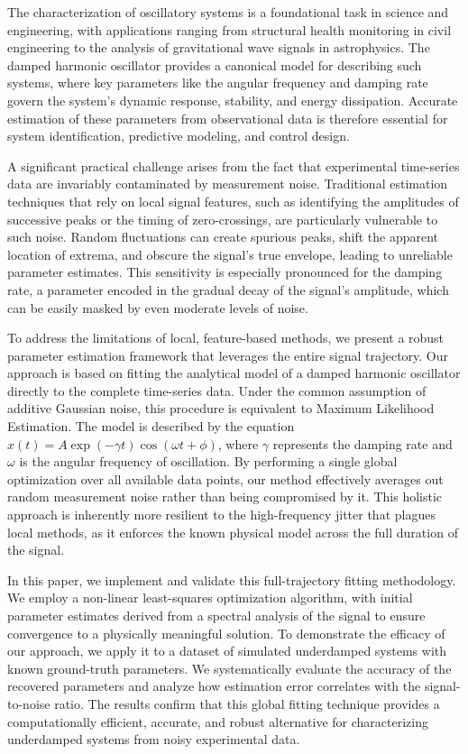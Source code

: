 \documentclass[]{article}
\begin{document}
The characterization of oscillatory systems is a foundational task in science and engineering, with applications ranging from structural health monitoring in civil engineering to the analysis of gravitational wave signals in astrophysics. The damped harmonic oscillator provides a canonical model for describing such systems, where key parameters like the angular frequency and damping rate govern the system's dynamic response, stability, and energy dissipation. Accurate estimation of these parameters from observational data is therefore essential for system identification, predictive modeling, and control design.

A significant practical challenge arises from the fact that experimental time-series data are invariably contaminated by measurement noise. Traditional estimation techniques that rely on local signal features, such as identifying the amplitudes of successive peaks or the timing of zero-crossings, are particularly vulnerable to such noise. Random fluctuations can create spurious peaks, shift the apparent location of extrema, and obscure the signal's true envelope, leading to unreliable parameter estimates. This sensitivity is especially pronounced for the damping rate, a parameter encoded in the gradual decay of the signal's amplitude, which can be easily masked by even moderate levels of noise.

To address the limitations of local, feature-based methods, we present a robust parameter estimation framework that leverages the entire signal trajectory. Our approach is based on fitting the analytical model of a damped harmonic oscillator directly to the complete time-series data. Under the common assumption of additive Gaussian noise, this procedure is equivalent to Maximum Likelihood Estimation. The model is described by the equation $x(t) = A \exp(-\gamma t) \cos(\omega t + \phi)$, where $\gamma$ represents the damping rate and $\omega$ is the angular frequency of oscillation. By performing a single global optimization over all available data points, our method effectively averages out random measurement noise rather than being compromised by it. This holistic approach is inherently more resilient to the high-frequency jitter that plagues local methods, as it enforces the known physical model across the full duration of the signal.

In this paper, we implement and validate this full-trajectory fitting methodology. We employ a non-linear least-squares optimization algorithm, with initial parameter estimates derived from a spectral analysis of the signal to ensure convergence to a physically meaningful solution. To demonstrate the efficacy of our approach, we apply it to a dataset of simulated underdamped systems with known ground-truth parameters. We systematically evaluate the accuracy of the recovered parameters and analyze how estimation error correlates with the signal-to-noise ratio. The results confirm that this global fitting technique provides a computationally efficient, accurate, and robust alternative for characterizing underdamped systems from noisy experimental data.
\end{document}
